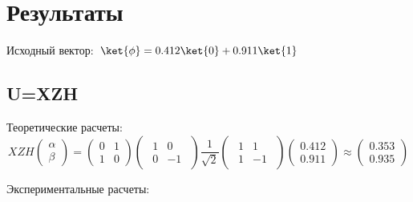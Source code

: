 \documentclass{article}
\begin{document}
\section{Результаты}

 Исходный вектор: $\ket{\phi} = 0.412\ket{0}+0.911\ket{1}$

\subsection{U=XZH}

Теоретические расчеты:
\begin{equation}
  XZH\begin{pmatrix} \alpha\\ \beta \end{pmatrix} = \begin{pmatrix} 0 & 1 \\ 1
                                                                      &
  0\end{pmatrix}\begin{pmatrix}\begin{array}{rr} 1 & 0 \\ 0 & -1 \end{array}
  \end{pmatrix}\frac{1}{\sqrt{2}}\begin{pmatrix}\begin{array}{rr} 1 & 1 \\ 1 &
  -1 \end{array} \end{pmatrix}\begin{pmatrix} 0.412 \\
  0.911\end{pmatrix}\approx\begin{pmatrix} 0.353\\0.935 \end{pmatrix}
  \end{equation}

Экспериментальные расчеты:

\begin{figure}[H]
\end{figure}
\end{document}
